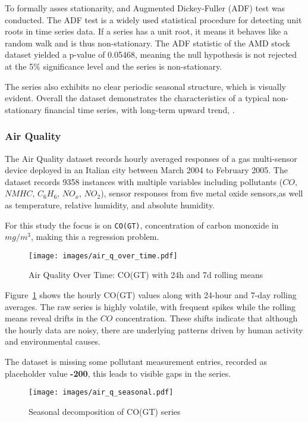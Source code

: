 \documentclass[conference]{IEEEtran}
\begin{document}
To formally asses stationarity, and Augmented Dickey-Fuller (ADF) test was conducted. The ADF test is a widely used statistical procedure for detecting unit roots in time series data. If a series has a unit root, it means it behaves like a random walk and is thus non-stationary. The ADF statistic of the AMD stock dataset yielded a p-value of 0.05468, meaning the null hypothesis is not rejected at the 5\% significance level and the series is non-stationary.

The series also exhibits no clear periodic seasonal structure, which is visually evident. Overall the dataset demonstrates the characteristics of a typical non-stationary financial time series, with long-term upward trend, \cite{stock_market_dataset_amd}.

\subsubsection{\textbf{Air Quality}}

The Air Quality dataset records hourly averaged responses of a gas multi-sensor device deployed in an Italian city between March 2004 to February 2005. The dataset records 9358 instances with multiple variables including pollutants ($CO$, $NMHC$, $C_6H_6$, $NO_x$, $NO_2$), sensor responses from five metal oxide sensors,as well as temperature, relative humidity, and absolute humidity.

For this study the focus is on \texttt{CO(GT)}, concentration of carbon monoxide in $mg/m^3$, making this a regression problem.

\begin{figure}[H]
\centering
\texttt{[image: images/air\_q\_over\_time.pdf]}
\caption{Air Quality Over Time: CO(GT) with 24h and 7d rolling means}
\label{fig:air_q_over_time}
\end{figure}

Figure~\ref{fig:air_q_over_time} shows the hourly CO(GT) values along with 24-hour and 7-day rolling averages. The raw series is highly volatile, with frequent spikes while the rolling means reveal drifts in the $CO$ concentration. These shifts indicate that although the hourly data are noisy, there are underlying patterns driven by human activity and environmental causes.

The dataset is missing some pollutant measurement entries, recorded as placeholder value \textbf{-200}, this leads to visible gaps in the series.

\begin{figure}[H]
\centering
\texttt{[image: images/air\_q\_seasonal.pdf]}
\caption{Seasonal decomposition of CO(GT) series}
\label{fig:air_q_seasonal}
\end{figure}
\end{document}
